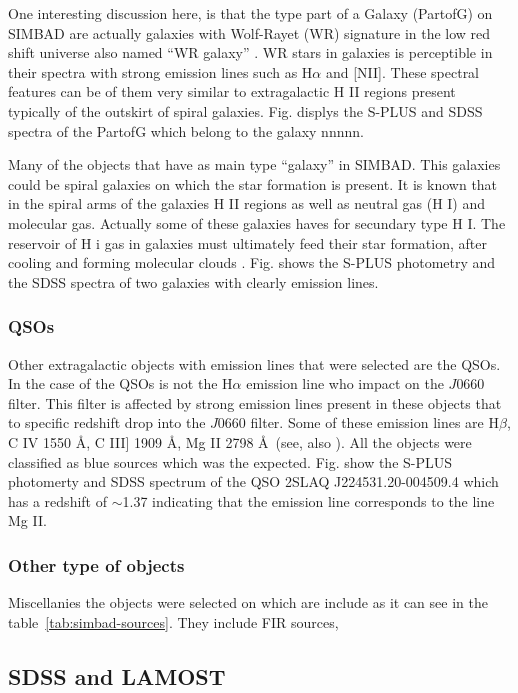 \documentclass[fleqn,usenatbib]{mnras}
\begin{document}
{One interesting discussion here, is that the type part of a Galaxy (PartofG)
on SIMBAD are actually galaxies with Wolf-Rayet (WR) signature in the low red shift
universe also named ``WR galaxy'' \citep{Osterbrock:1982}. WR stars in galaxies
is perceptible in their spectra with strong emission lines such as H{$\alpha$}
and [NII]. These spectral features can be of them very similar to extragalactic
H II regions present typically of the outskirt of spiral galaxies. Fig. displys
the S-PLUS and SDSS spectra of the PartofG which belong to the galaxy nnnnn.

Many of the objects that have as main type ``galaxy'' in SIMBAD. This galaxies
could be spiral galaxies on which the star formation is present. It is known
that in the spiral arms of the galaxies H II regions as well as
neutral gas (H I) and molecular gas. Actually some of these galaxies haves for
secundary type H I. The reservoir of H i gas in galaxies must ultimately
feed their star formation, after cooling and forming molecular
clouds \citep{van-Driel:2016}. Fig. shows the S-PLUS photometry and
the SDSS spectra of two galaxies with clearly emission lines. 


\subsubsection{QSOs}
Other extragalactic objects with emission lines that were selected are the
QSOs. In the case of the QSOs is not the H{$\alpha$} emission line who impact
on the $J$0660 filter. This filter is affected by strong emission lines present in
these objects that to specific redshift drop into the $J$0660 filter.
Some of these emission lines are H{$\beta$}, C {\sc IV} 1550 \AA, C {\sc III]} 1909 \AA,
  Mg {\sc II} 2798 \AA~(see, also \citealp{Gutierrez:2020, Nakazono:2021}).
  All the objects were classified as blue sources which was the expected.
  Fig. show the S-PLUS photomerty and SDSS spectrum of the QSO 2SLAQ J224531.20-004509.4
  which has a redshift of $\sim$1.37 indicating that the emission line corresponds to
  the line Mg {\sc II}.
  

  \subsubsection{Other type of objects}
  Miscellanies the objects were selected on which are include as it can see in the
  table~\ref{tab:simbad-sources}. They include FIR sources, 


\subsection{SDSS and LAMOST}

}
\end{document}
